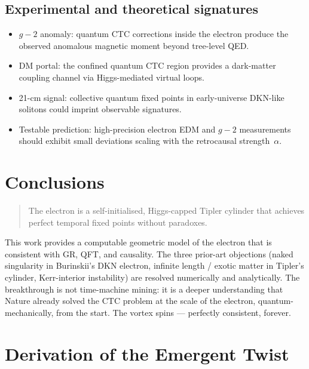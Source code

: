 \documentclass[11pt,a4paper]{article}
\theoremstyle{definition}
\theoremstyle{remark}
\begin{document}
\subsection{Experimental and theoretical signatures}
\begin{itemize}[leftmargin=1.2em,itemsep=0.1em]
  \item $g-2$ anomaly: quantum CTC corrections inside the electron
    produce the observed anomalous magnetic moment beyond tree-level QED.
  \item DM portal: the confined quantum CTC region provides a
    dark-matter coupling channel via Higgs-mediated virtual loops.
  \item 21-cm signal: collective quantum fixed points in early-universe
    DKN-like solitons could imprint observable signatures.
  \item Testable prediction: high-precision electron EDM and $g-2$
    measurements should exhibit small deviations scaling with the
    retrocausal strength~$\alpha$.
\end{itemize}

\section{Conclusions}\label{sec:conclusions}

\begin{quote}
The electron is a self-initialised, Higgs-capped Tipler cylinder that
achieves perfect temporal fixed points without paradoxes.
\end{quote}
This work provides a computable geometric model of the electron that is
consistent with GR, QFT, and causality. The three prior-art objections
(naked singularity in Burinskii's DKN electron, infinite length /
exotic matter in Tipler's cylinder, Kerr-interior instability) are
resolved numerically and analytically. The breakthrough is not
time-machine mining: it is a deeper understanding that Nature already
solved the CTC problem at the scale of the electron, quantum-mechanically,
from the start. The vortex spins --- perfectly consistent, forever.

\appendix

\section{Derivation of the Emergent Twist}\label{app:twist-emergence}
\end{document}
